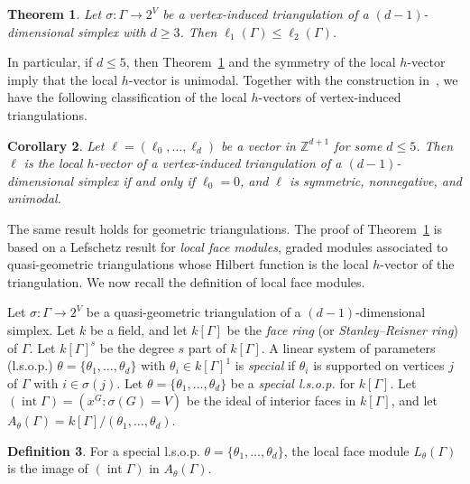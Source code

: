 \documentclass[11pt]{article}
\newtheorem{theo}{Theorem}[section]
\newtheorem{coro}[theo]{Corollary}
\theoremstyle{definition}
\newtheorem{defi}[theo]{Definition}
\numberwithin{equation}{section}
\numberwithin{equation}{section}
\begin{document}
\begin{theo}\label{thm:combineq}
Let $\sigma \colon \Gamma \to 2^V$ be a vertex-induced triangulation of a $(d-1)$-dimensional simplex with $d \ge 3$. Then $\ell_1(\Gamma) \le \ell_2(\Gamma)$. 
\end{theo}

In particular, if $d \le 5$, then Theorem~\ref{thm:combineq} and the symmetry of the local $h$-vector imply that the local $h$-vector is unimodal. Together with the construction in~\cite{ChanLocal}, we have the following classification of the local $h$-vectors of vertex-induced triangulations. 

\begin{coro}
Let $\ell = (\ell_0, \dotsc, \ell_d)$ be a vector in $\mathbb{Z}^{d+1}$ for some $d \le 5$. Then $\ell$ is the local $h$-vector of a vertex-induced triangulation of a $(d-1)$-dimensional simplex if and only if $\ell_0 = 0$, and $\ell$ is symmetric, nonnegative, and unimodal. 
\end{coro}

The same result holds for geometric triangulations. The proof of Theorem~\ref{thm:combineq} is based on a Lefschetz result for \emph{local face modules}, graded modules associated to quasi-geometric triangulations whose Hilbert function is the local $h$-vector of the triangulation. We now recall the definition of local face modules. 

Let $\sigma \colon \Gamma \to 2^V$ be a quasi-geometric triangulation of a $(d-1)$-dimensional simplex. 
Let $k$ be a field, and let $k[\Gamma]$ be the \emph{face ring} (or \emph{Stanley--Reisner ring}) of $\Gamma$. Let $k[\Gamma]^s$ be the degree $s$ part of $k[\Gamma]$. 
A linear system of parameters (l.s.o.p.) 
$ \theta = \{ \theta_1,\ldots,\theta_d \}$ with $\theta_i \in k[\Gamma]^1$
is \emph{special} if $\theta_i$ is supported on vertices $j$ of $\Gamma$ with $i \in \sigma(j)$. 
Let $\theta = \{ \theta_1,\ldots,\theta_d \}$ be a \emph{special l.s.o.p.} for $k[\Gamma]$.   Let $(\operatorname{int} \Gamma) = (x^G : \sigma(G) = V)$ be the ideal of interior faces in $k[\Gamma]$, and  let $A_{\theta}(\Gamma) = k[\Gamma]/(\theta_1, \dotsc, \theta_d)$.

\begin{defi}\label{def:localfacemodule}
For a special l.s.o.p. 
$\theta = \{ \theta_1,\ldots,\theta_d \}$,
the local face module $L_{\theta}(\Gamma)$ is the image of $(\operatorname{int} \Gamma)$ in
$A_{\theta}(\Gamma)$. 
\end{defi}
\end{document}
